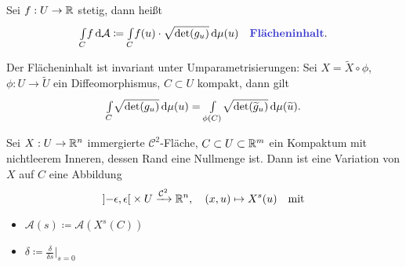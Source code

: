 \documentclass{cheat-sheet}
\newcommand{\A}{\mathcal{A}}
\begin{document}




\begin{definition}
  Sei $f : U \to \mathbb{R}$ stetig, dann heißt
  \[ \Int{C}{}{f}{\A} \coloneqq \Int{C}{}{f(u) \cdot \sqrt{\det(g_u)}}{\mu (u)} \quad \text{\emph{Flächeninhalt}.} \]
\end{definition}

\begin{prop}
  Der Flächeninhalt ist invariant unter Umparametrisierungen: Sei $X = \widetilde{X} \circ \phi$, $\phi : U \to \widetilde{U}$ ein Diffeomorphismus, $C \subset U$ kompakt, dann gilt
  \[ {\textstyle \int\limits_{C}^{}} \sqrt{\det(g_u)} \,\mathrm{d} \mu (u) = {\textstyle \int\limits_{\phi(C)}^{}} \sqrt{\det(\widetilde{g}_u)} \,\mathrm{d} \mu (\widetilde{u}). \]
\end{prop}



\begin{definition}
  Sei $X : U \to \mathbb{R}^n$ immergierte $\mathcal{C}^2$-Fläche,
  $C \subset U \subset \mathbb{R}^m$ ein Kompaktum mit nichtleerem Inneren, dessen Rand eine Nullmenge ist.
  Dann ist eine Variation von $X$ auf $C$ eine Abbildung
  \[
    \left] -\epsilon, \epsilon \right[ \times U \xrightarrow{\mathcal{C}^2} \mathbb{R}^n, \quad
    (x, u) \mapsto X^s(u) \quad \text{mit}
  \]
  \begin{itemize}
  \end{itemize}
\end{definition}

\begin{nota}
  \begin{multicols}{2}
    \begin{itemize}
      \item $\A(s) \coloneqq \A(X^s(C))$
      \item $\delta \coloneqq \tfrac{\delta}{\delta s}|_{s = 0}$
    \end{itemize}
  \end{multicols}
\end{nota}
\end{document}
